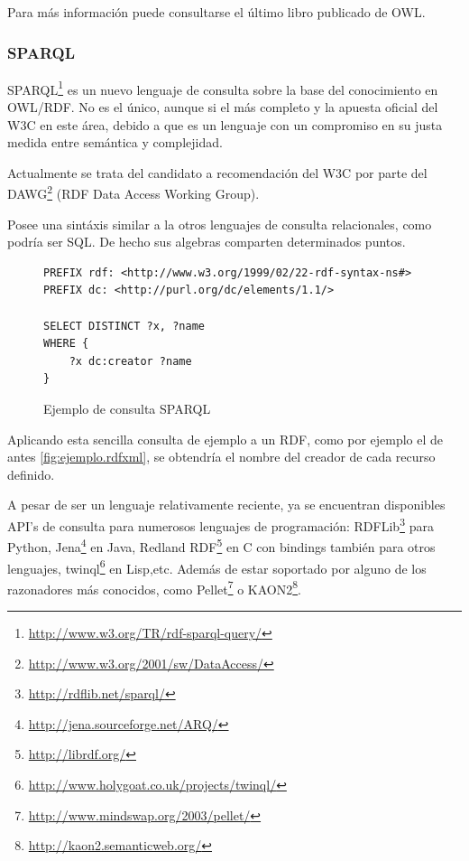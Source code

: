 Para más información puede consultarse el último libro publicado de 
OWL\cite{OWLBook}.

\subsubsection{SPARQL}

SPARQL\footnote{\url{http://www.w3.org/TR/rdf-sparql-query/}} es un nuevo lenguaje
de consulta sobre la base del conocimiento en OWL/RDF. No es el único\cite{ComparisonRDFQuery},
aunque si el más completo y la apuesta oficial del W3C en este área, debido a que es
un lenguaje con un compromiso en su justa medida entre semántica y 
complejidad\cite{SemanticsComplexitySPARQL}. 

Actualmente se trata del candidato a recomendación del W3C por parte del 
DAWG\footnote{\url{http://www.w3.org/2001/sw/DataAccess/}} (RDF Data Access Working 
Group).

Posee una sintáxis similar a la otros lenguajes de consulta relacionales, como
podría ser SQL. De hecho sus algebras comparten\cite{RelationalAlgebraSPARQL} 
determinados puntos. 

\begin{figure}[H]
\begin{lstlisting}
PREFIX rdf: <http://www.w3.org/1999/02/22-rdf-syntax-ns#>
PREFIX dc: <http://purl.org/dc/elements/1.1/>

SELECT DISTINCT ?x, ?name
WHERE {
	?x dc:creator ?name
}
\end{lstlisting}
\caption{Ejemplo de consulta SPARQL}
\label{fig:ejemplo.sparql}
\end{figure}

Aplicando esta sencilla consulta de ejemplo a un RDF, como por ejemplo el de 
antes \ref{fig:ejemplo.rdfxml}, se obtendría el nombre del creador de cada recurso
definido.

A pesar de ser un lenguaje relativamente reciente, ya se encuentran disponibles
API's de consulta para numerosos lenguajes de programación: 
RDFLib\footnote{\url{http://rdflib.net/sparql/}} para Python, 
Jena\footnote{\url{http://jena.sourceforge.net/ARQ/}} en Java, 
Redland RDF\footnote{\url{http://librdf.org/}} en C con bindings también para 
otros lenguajes, twinql\footnote{\url{http://www.holygoat.co.uk/projects/twinql/}} 
en Lisp,etc. Además de estar soportado por alguno de los razonadores más conocidos, 
como Pellet\footnote{\url{http://www.mindswap.org/2003/pellet/}} o 
KAON2\footnote{\url{http://kaon2.semanticweb.org/}}.

